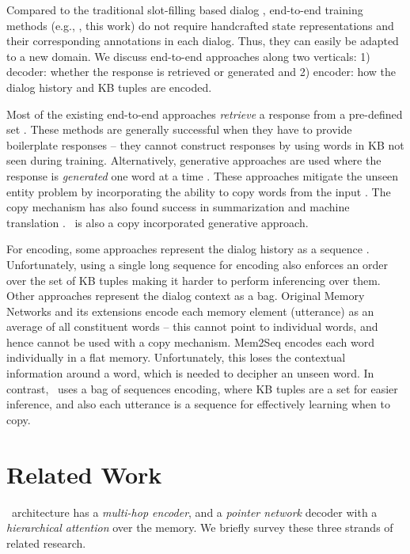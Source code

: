 Compared to the traditional slot-filling based dialog  \cite{williams2007partially,wen2017network,williams2017hybrid}, 
end-to-end training methods (e.g., \cite{BordesW16}, this work) do not require handcrafted state representations and their corresponding annotations in each dialog. Thus, they can easily be adapted to a new domain.  We discuss end-to-end approaches along two verticals: 1) decoder: whether the response is retrieved or generated and 2) encoder: how the dialog history and KB tuples are encoded.

Most of the existing end-to-end approaches  {\em retrieve} a response from a pre-defined set \cite{BordesW16,liu2017gated,seo2016query}. These methods are generally successful when they have to provide boilerplate responses -- they cannot construct responses by using words in KB not seen during training. 
Alternatively, generative approaches are used where the response is {\em generated} one word at a time \cite{eric2017copy,mem2seq}. These approaches mitigate the unseen entity problem by incorporating the ability to copy words from the input \cite{vinyals2015pointer,gu2016incorporating}. The copy mechanism has also found success in summarization \cite{nallapati2016abstractive,see2017get} and machine translation \cite{ptr-unk}. \sys\ is also a copy incorporated generative approach. 

For encoding, some approaches represent the dialog history as a sequence \cite{eric2017copy,ptr-unk}. Unfortunately, using a single long sequence for encoding also enforces an order over the set of KB tuples making it harder to perform inferencing over them. Other approaches represent the dialog context as a bag. Original Memory Networks \cite{BordesW16} and its extensions encode each memory element (utterance) as an average of all constituent words -- this cannot point to individual words, and hence cannot be used with a copy mechanism. Mem2Seq encodes each word individually in a flat memory. Unfortunately, this loses the contextual information around a word, which is needed to decipher an unseen word. In contrast, \sys\ uses a bag of sequences encoding, where KB tuples are a set for easier inference, and also each utterance is a sequence for effectively learning when to copy.  

\section{Related Work}

\sys\ architecture has a {\em multi-hop encoder}, and a {\em pointer network} decoder with a {\em hierarchical attention} over the memory. We briefly survey these three strands of related research.


